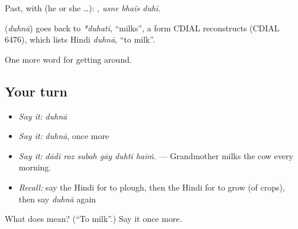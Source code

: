 Past, with  (he or she …):   , \emph{usne bhaĩs duhī}.

\begin{cousinweb}
\textbf{} (\emph{duhnā}) goes back to \emph{*duhati}, \textquotedblleft{}milks\textquotedblright{}, a form CDIAL reconstructs (CDIAL 6476), which lists Hindi \emph{duhnā}, \textquotedblleft{}to milk\textquotedblright{}.
\end{cousinweb}

\begin{grammarlens}[title={What you've built}]
One more word for getting around.
\end{grammarlens}

\subsection*{Your turn}
\begin{itemize}
\raggedright
  \item \emph{Say it:} \emph{duhnā}
  \item \emph{Say it:} \emph{duhnā}, once more
  \item \emph{Say it:} \emph{dādī roz subah gāy duhtī haiṁ.} — Grandmother milks the cow every morning.
  \item \emph{Recall:} say the Hindi for to plough, then the Hindi for to grow (of crops), then say \emph{duhnā} again
\end{itemize}

\begin{tcolorbox}[breakable,colback=teal!4,colframe=teal!35!black,title={Before you move on}]
What does  mean? (\textquotedblleft{}To milk\textquotedblright{}.) Say it once more.
\end{tcolorbox}

